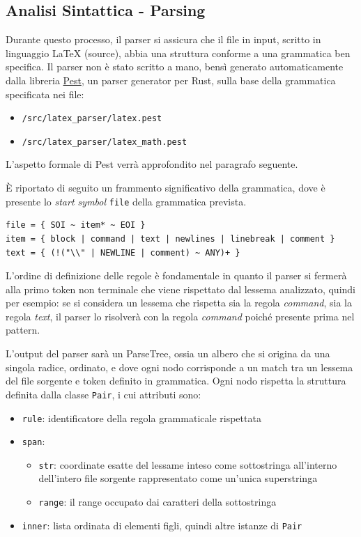 \documentclass{article}
\begin{document}
    \subsection{Analisi Sintattica - Parsing}

    Durante questo processo, il parser si assicura che il file in input, scritto in linguaggio LaTeX (source), abbia una struttura conforme a una grammatica ben specifica.
    Il parser non è stato scritto a mano, bensì generato automaticamente dalla libreria \href{https://docs.rs/pest/2.8.6/pest/}{Pest}, un parser generator per Rust, sulla base della grammatica specificata nei file:
    \begin{itemize}
        \item \texttt{/src/latex\_parser/latex.pest}
        \item \texttt{/src/latex\_parser/latex\_math.pest}
    \end{itemize}
    L'aspetto formale di Pest verrà approfondito nel paragrafo seguente.

    È riportato di seguito un frammento significativo della grammatica, dove è presente lo \textit{start symbol} \texttt{file} della grammatica prevista.

    \begin{verbatim}
file = { SOI ~ item* ~ EOI }
item = { block | command | text | newlines | linebreak | comment }
text = { (!("\\" | NEWLINE | comment) ~ ANY)+ }
    \end{verbatim}

    L'ordine di definizione delle regole è fondamentale in quanto il parser si fermerà alla primo token non terminale che viene rispettato dal lessema analizzato, quindi per esempio: se si considera un lessema che rispetta sia la regola \textit{command}, sia la regola \textit{text}, il parser lo risolverà con la regola \textit{command} poiché presente prima nel pattern.

    L'output del parser sarà un ParseTree, ossia un albero che si origina da una singola radice, ordinato, e dove ogni nodo corrisponde a un match tra un lessema del file sorgente e token definito in grammatica.
    Ogni nodo rispetta la struttura definita dalla classe \texttt{Pair}, i cui attributi sono:
    \begin{itemize}
        \item \texttt{rule}: identificatore della regola grammaticale rispettata
        \item \texttt{span}:
        \begin{itemize}
            \item \texttt{str}: coordinate esatte del lessame inteso come sottostringa all'interno dell'intero file sorgente rappresentato come un'unica superstringa
            \item \texttt{range}: il range occupato dai caratteri della sottostringa
        \end{itemize}
        \item \texttt{inner}: lista ordinata di elementi figli, quindi altre istanze di \texttt{Pair}
    \end{itemize}
\end{document}
